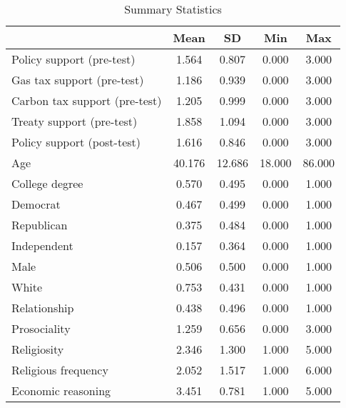 \begin{table*}

\caption{Summary Statistics \label{tab:summary_stats}}
\centering
\begin{tabular}[t]{lcccc}
\toprule
 & Mean & SD & Min & Max\\
\midrule
Policy support (pre-test) & 1.564 & 0.807 & 0.000 & 3.000\\
Gas tax support (pre-test) & 1.186 & 0.939 & 0.000 & 3.000\\
Carbon tax support (pre-test) & 1.205 & 0.999 & 0.000 & 3.000\\
Treaty support (pre-test) & 1.858 & 1.094 & 0.000 & 3.000\\
Policy support (post-test) & 1.616 & 0.846 & 0.000 & 3.000\\
\addlinespace
Age & 40.176 & 12.686 & 18.000 & 86.000\\
College degree & 0.570 & 0.495 & 0.000 & 1.000\\
Democrat & 0.467 & 0.499 & 0.000 & 1.000\\
Republican & 0.375 & 0.484 & 0.000 & 1.000\\
Independent & 0.157 & 0.364 & 0.000 & 1.000\\
\addlinespace
Male & 0.506 & 0.500 & 0.000 & 1.000\\
White & 0.753 & 0.431 & 0.000 & 1.000\\
Relationship & 0.438 & 0.496 & 0.000 & 1.000\\
Prosociality & 1.259 & 0.656 & 0.000 & 3.000\\
Religiosity & 2.346 & 1.300 & 1.000 & 5.000\\
\addlinespace
Religious frequency & 2.052 & 1.517 & 1.000 & 6.000\\
Economic reasoning & 3.451 & 0.781 & 1.000 & 5.000\\
\bottomrule
\end{tabular}
\end{table*}
